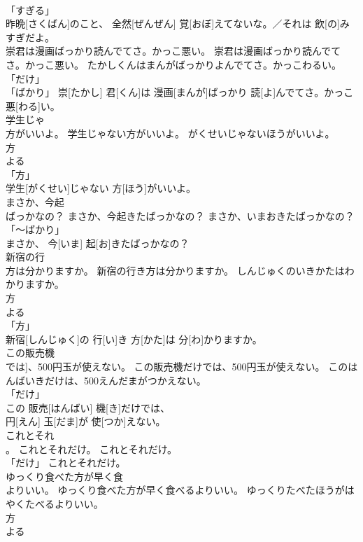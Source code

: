 \documentclass[8pt]{extreport}
\begin{document}
\begin{CJK}{UTF8}{min}
\\	「すぎる」 
\\	昨晩[さくばん]のこと、 全然[ぜんぜん] 覚[おぼ]えてないな。／それは 飲[の]みすぎだよ。		
\\	崇君は漫画ばっかり読んでてさ。かっこ悪い。	崇君は漫画ばっかり読んでてさ。かっこ悪い。	たかしくんはまんがばっかりよんでてさ。かっこわるい。	
\\	「だけ」 
\\	「ばかり」	崇[たかし] 君[くん]は 漫画[まんが]ばっかり 読[よ]んでてさ。かっこ 悪[わる]い。		
\\	学生じゃ
\\	方がいいよ。	学生じゃない方がいいよ。	がくせいじゃないほうがいいよ。	
\\	方 
\\	よる 
\\	「方」 
\\	学生[がくせい]じゃない 方[ほう]がいいよ。		
\\	まさか、今起
\\	ばっかなの？	まさか、今起きたばっかなの？	まさか、いまおきたばっかなの？	
\\	「～ばかり」 
\\	まさか、 今[いま] 起[お]きたばっかなの？		
\\	新宿の行
\\	方は分かりますか。	新宿の行き方は分かりますか。	しんじゅくのいきかたはわかりますか。	
\\	方 
\\	よる 
\\	「方」 
\\	新宿[しんじゅく]の 行[い]き 方[かた]は 分[わ]かりますか。		
\\	この販売機
\\	では]、500円玉が使えない。	この販売機だけでは、500円玉が使えない。	このはんばいきだけは、500えんだまがつかえない。	
\\	「だけ」 
\\	この 販売[はんばい] 機[き]だけでは、 
\\	円[えん] 玉[だま]が 使[つか]えない。		
\\	これとそれ
\\	。	これとそれだけ。	これとそれだけ。	
\\	「だけ」	これとそれだけ。		
\\	ゆっくり食べた方が早く食
\\	よりいい。	ゆっくり食べた方が早く食べるよりいい。	ゆっくりたべたほうがはやくたべるよりいい。	
\\	方 
\\	よる 

\end{CJK}
\end{document}
